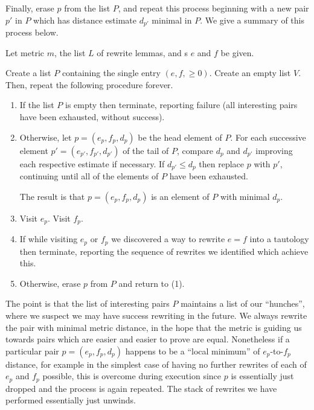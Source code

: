 \documentclass[12pt]{easychair}
\begin{document}
Finally, erase $p$ from the list $P$, and repeat this process beginning with a new pair $p'$ in $P$ which has distance estimate $d_{p'}$ minimal in $P$. We give a summary of this process below.

\begin{alg}
    \item Let metric $m$, the list $L$ of rewrite lemmas, and \expr{}s $e$ and $f$ be given.

    \item Create a list $P$ containing the single entry $(e, f, \geq 0)$. Create an empty list $V$. Then, repeat the following procedure forever.

    \begin{enumerate}[label={(\arabic*).}]
      \item If the list $P$ is empty then terminate, reporting failure (all interesting pairs have been exhausted, without success).

      \item Otherwise, let $p = (e_p, f_p, d_p)$ be the head element of $P$. For each successive element $p' = (e_{p'}, f_{p'}, d_{p'})$ of the tail of $P$, compare $d_{p}$ and $d_{p'}$ improving each respective estimate if necessary. If $d_{p'} \leq d_p$ then replace $p$ with $p'$, continuing until all of the elements of $P$ have been exhausted.

      The result is that $p = (e_p, f_p, d_p)$ is an element of $P$ with minimal $d_p$.

      \item Visit $e_p$. Visit $f_p$.

      \item If while visiting $e_p$ or $f_p$ we discovered a way to rewrite $e = f$ into a tautology then terminate, reporting the sequence of rewrites we identified which achieve this.

      \item Otherwise, erase $p$ from $P$ and return to (1).
  \end{enumerate}
\end{alg}

The point is that the list of interesting pairs $P$ maintains a list of our ``hunches'', where we suspect we may have success rewriting in the future. We always rewrite the pair with minimal metric distance, in the hope that the metric is guiding us towards pairs which are easier and easier to prove are equal. Nonetheless if a particular pair $p = (e_p, f_p, d_p)$ happens to be a ``local minimum'' of $e_p$-to-$f_p$ distance, for example in the simplest case of having no further rewrites of each of $e_p$ and $f_p$ possible, this is overcome during execution since $p$ is essentially just dropped and the process is again repeated. The stack of rewrites we have performed essentially just unwinds.
\end{document}
